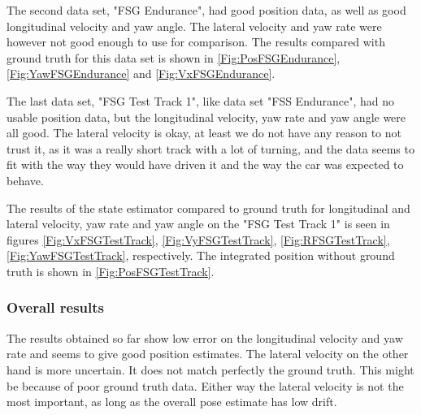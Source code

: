 The second data set, "FSG Endurance", had good position data, as well as good longitudinal velocity and yaw angle. The lateral velocity and yaw rate were however not good enough to use for comparison. The results compared with ground truth for this data set is shown in \ref{Fig:PosFSGEndurance}, \ref{Fig:YawFSGEndurance} and \ref{Fig:VxFSGEndurance}. 

The last data set, "FSG Test Track 1", like data set "FSS Endurance", had no usable position data, but the longitudinal velocity, yaw rate and yaw angle were all good. The lateral velocity is okay, at least we do not have any reason to not trust it, as it was a really short track with a lot of turning, and the data seems to fit with the way they would have driven it and the way the car was expected to behave. 

The results of the state estimator compared to ground truth for longitudinal  and lateral velocity, yaw rate and yaw angle on the "FSG Test Track 1" is seen in figures \ref{Fig:VxFSGTestTrack}, \ref{Fig:VyFSGTestTrack}, \ref{Fig:RFSGTestTrack}, \ref{Fig:YawFSGTestTrack}, respectively. The integrated position without ground truth is shown in \ref{Fig:PosFSGTestTrack}. 

\subsubsection{Overall results}

The results obtained so far show low error on the longitudinal velocity and yaw rate and seems to give good position estimates. The lateral velocity on the other hand is more uncertain. It does not match perfectly the ground truth. This might be because of poor ground truth data. Either way the lateral velocity is not the most important, as long as the overall pose estimate has low drift. 

\FloatBarrier

